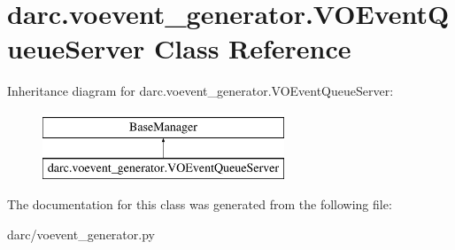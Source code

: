 \hypertarget{classdarc_1_1voevent__generator_1_1_v_o_event_queue_server}{}\section{darc.\+voevent\+\_\+generator.\+V\+O\+Event\+Queue\+Server Class Reference}
\label{classdarc_1_1voevent__generator_1_1_v_o_event_queue_server}
Inheritance diagram for darc.\+voevent\+\_\+generator.\+V\+O\+Event\+Queue\+Server\+:\begin{figure}[H]
\begin{center}
\leavevmode
\includegraphics[height=2.000000cm]{classdarc_1_1voevent__generator_1_1_v_o_event_queue_server}
\end{center}
\end{figure}


The documentation for this class was generated from the following file\+:\begin{DoxyCompactItemize}
\item 
darc/voevent\+\_\+generator.\+py\end{DoxyCompactItemize}
